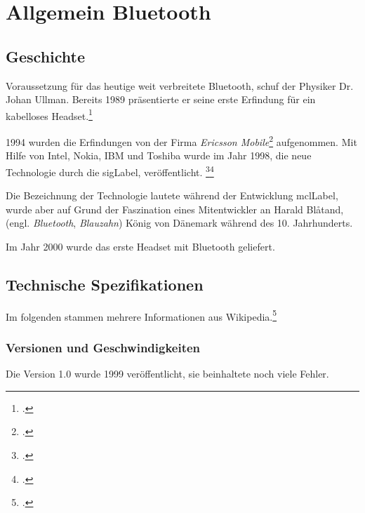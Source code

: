 \chapter{Allgemein Bluetooth}
\label{ch:general}

\section{Geschichte}
Voraussetzung für das heutige weit verbreitete Bluetooth, schuf der Physiker Dr. Johan Ullman.
Bereits 1989 präsentierte er seine erste Erfindung für ein kabelloses Headset.\footcite{Bluetooth_Wikipedia_2015-04-17}

1994 wurden die Erfindungen von der Firma \textit{Ericsson Mobile}\footcite{Ericsson_2015-04-17} aufgenommen.
Mit Hilfe von Intel, Nokia, IBM und Toshiba wurde im Jahr 1998, die neue Technologie durch die \gls{sigLabel}, veröffentlicht.
\footcite{Bluetooth_Special_Interest_Group_Wikipedia_2015-04-17}\footcite{The_history_of_Bluetooth_Ericsson_History_2015-04-17}

Die Bezeichnung der Technologie lautete während der Entwicklung \gls{mclLabel}, wurde aber auf Grund der Faszination eines Mitentwickler an Harald Bl{\aa}tand, (engl. \textit{Bluetooth}, \textit{Blauzahn}) König von Dänemark während des 10. Jahrhunderts.

Im Jahr 2000 wurde das erste Headset mit Bluetooth geliefert.

\section{Technische Spezifikationen}
\label{sec:general_specs}
Im folgenden  stammen mehrere Informationen aus Wikipedia.\footcite{Bluetooth_Wikipedia_2015-04-17}

\subsection{Versionen und Geschwindigkeiten}
Die Version 1.0 wurde 1999 veröffentlicht, sie beinhaltete noch viele Fehler.

